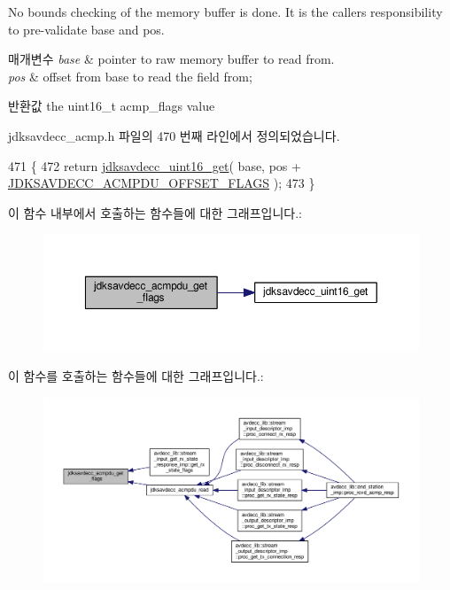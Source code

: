 No bounds checking of the memory buffer is done. It is the caller\textquotesingle{}s responsibility to pre-\/validate base and pos.


\begin{DoxyParams}{매개변수}
{\em base} & pointer to raw memory buffer to read from. \\
\hline
{\em pos} & offset from base to read the field from; \\
\hline
\end{DoxyParams}
\begin{DoxyReturn}{반환값}
the uint16\+\_\+t acmp\+\_\+flags value 
\end{DoxyReturn}


jdksavdecc\+\_\+acmp.\+h 파일의 470 번째 라인에서 정의되었습니다.


\begin{DoxyCode}
471 \{
472     \textcolor{keywordflow}{return} \hyperlink{group__endian_ga3fbbbc20be954aa61e039872965b0dc9}{jdksavdecc\_uint16\_get}( base, pos + 
      \hyperlink{group__acmpdu_ga8c9ed657619402f01b4b990f7771a97c}{JDKSAVDECC\_ACMPDU\_OFFSET\_FLAGS} );
473 \}
\end{DoxyCode}


이 함수 내부에서 호출하는 함수들에 대한 그래프입니다.\+:
\nopagebreak
\begin{figure}[H]
\begin{center}
\leavevmode
\includegraphics[width=350pt]{group__acmpdu_ga06f11c5b5fb71fe01ca397e95848fcb6_cgraph}
\end{center}
\end{figure}




이 함수를 호출하는 함수들에 대한 그래프입니다.\+:
\nopagebreak
\begin{figure}[H]
\begin{center}
\leavevmode
\includegraphics[width=350pt]{group__acmpdu_ga06f11c5b5fb71fe01ca397e95848fcb6_icgraph}
\end{center}
\end{figure}


